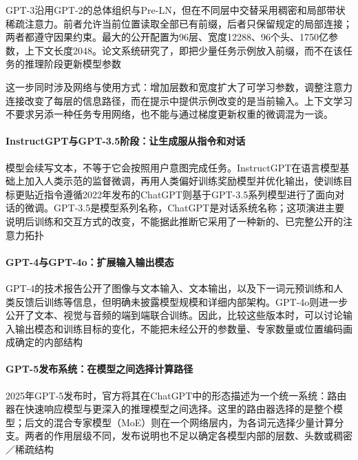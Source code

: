 GPT-3沿用GPT-2的总体组织与Pre-LN，但在不同层中交替采用稠密和局部带状稀疏注意力。前者允许当前位置读取全部已有前缀，后者只保留规定的局部连接；两者都遵守因果约束。最大的公开配置为96层、宽度12288、96个头、1750亿参数，上下文长度2048。论文系统研究了，即把少量任务示例放入前缀，而不在该任务的推理阶段更新模型参数

这一步同时涉及网络与使用方式：增加层数和宽度扩大了可学习参数，调整注意力连接改变了每层的信息路径，而在提示中提供示例改变的是当前输入。上下文学习不要求另添一种任务专用网络，也不能与通过梯度更新权重的微调混为一谈。

\Needspace{165mm}
\paragraph{InstructGPT与GPT-3.5阶段：让生成服从指令和对话}

模型会续写文本，不等于它会按照用户意图完成任务。InstructGPT在语言模型基础上加入人类示范的监督微调，再用人类偏好训练奖励模型并优化输出，使训练目标更贴近指令遵循2022年发布的ChatGPT则基于GPT-3.5系列模型进行了面向对话的微调。GPT-3.5是模型系列名称，ChatGPT是对话系统名称；这项演进主要说明后训练和交互方式的改变，不能据此推断它采用了一种新的、已完整公开的注意力拓扑

\paragraph{GPT-4与GPT-4o：扩展输入输出模态}

GPT-4的技术报告公开了图像与文本输入、文本输出，以及下一词元预训练和人类反馈后训练等信息，但明确未披露模型规模和详细内部架构。GPT-4o则进一步公开了文本、视觉与音频的端到端联合训练。因此，比较这些版本时，可以讨论输入输出模态和训练目标的变化，不能把未经公开的参数量、专家数量或位置编码画成确定的内部结构

\paragraph{GPT-5发布系统：在模型之间选择计算路径}

2025年GPT-5发布时，官方将其在ChatGPT中的形态描述为一个统一系统：路由器在快速响应模型与更深入的推理模型之间选择。这里的路由器选择的是整个模型；后文的混合专家模型（MoE）则在一个网络层内，为各词元选择少量计算分支。两者的作用层级不同，发布说明也不足以确定各模型内部的层数、头数或稠密／稀疏结构

